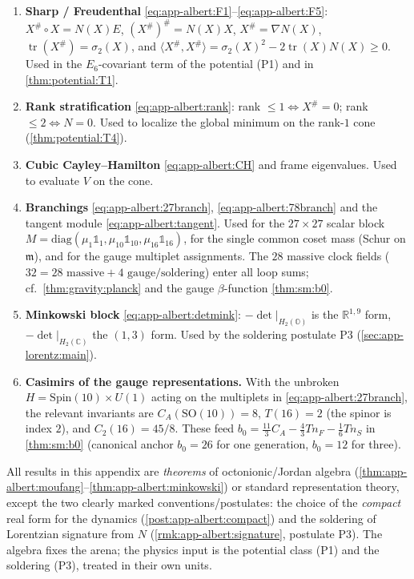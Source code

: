 \begin{enumerate}
  \item \textbf{Sharp / Freudenthal} \eqref{eq:app-albert:F1}--\eqref{eq:app-albert:F5}:
    $X^\#\circ X=N(X)E$, $(X^\#)^\#=N(X)X$, $X^\#=\nabla N(X)$,
    $\operatorname{tr}(X^\#)=\sigma_2(X)$, and
    $\langle X^\#,X^\#\rangle=\sigma_2(X)^2-2\operatorname{tr}(X)N(X)\ge0$. Used in
    the $E_6$-covariant term of the potential (P1) and in
    \autoref{thm:potential:T1}.
  \item \textbf{Rank stratification} \eqref{eq:app-albert:rank}: rank $\le1
    \Leftrightarrow X^\#=0$; rank $\le2\Leftrightarrow N=0$. Used to localize the
    global minimum on the rank-$1$ cone (\autoref{thm:potential:T4}).
  \item \textbf{Cubic Cayley--Hamilton} \eqref{eq:app-albert:CH} and frame
    eigenvalues. Used to evaluate $V$ on the cone.
  \item \textbf{Branchings} \eqref{eq:app-albert:27branch},
    \eqref{eq:app-albert:78branch} and the tangent module
    \eqref{eq:app-albert:tangent}. Used for the $27\times27$ scalar block
    $M=\mathrm{diag}(\mu_1\mathbb 1_1,\mu_{10}\mathbb 1_{10},\mu_{16}\mathbb 1_{16})$,
    for the single common coset mass (Schur on $\mathfrak m$), and for the gauge
    multiplet assignments. The $28$ massive clock fields
    ($32=28\text{ massive}+4\text{ gauge/soldering}$) enter all loop sums; cf.\
    \autoref{thm:gravity:planck} and the gauge $\beta$-function
    \autoref{thm:sm:b0}.
  \item \textbf{Minkowski block} \eqref{eq:app-albert:detmink}: $-\det|_{H_2
    (\mathbb O)}$ is the $\mathbb R^{1,9}$ form, $-\det|_{H_2(\mathbb C)}$ the
    $(1,3)$ form. Used by the soldering postulate P3
    (\autoref{sec:app-lorentz:main}).
  \item \textbf{Casimirs of the gauge representations.} With the unbroken
    $H=\mathrm{Spin}(10)\times U(1)$ acting on the multiplets in
    \eqref{eq:app-albert:27branch}, the relevant invariants are
    $C_A(\mathrm{SO}(10))=8$, $T(16)=2$ (the spinor is index $2$), and
    $C_2(16)=45/8$. These feed
    $b_0=\tfrac{11}{3}C_A-\tfrac43 T n_F-\tfrac16 T n_S$ in
    \autoref{thm:sm:b0} (canonical anchor $b_0=26$ for one generation,
    $b_0=12$ for three).
\end{enumerate}

\begin{remark}[Status]\label{rmk:app-albert:status}
All results in this appendix are \emph{theorems} of octonionic/Jordan algebra
(\autoref{thm:app-albert:moufang}--\autoref{thm:app-albert:minkowski}) or standard
representation theory, except the two clearly marked conventions/postulates: the
choice of the \emph{compact} real form for the dynamics
(\autoref{post:app-albert:compact}) and the soldering of Lorentzian signature from
$N$ (\autoref{rmk:app-albert:signature}, postulate P3). The algebra fixes the
arena; the physics input is the potential class (P1) and the soldering (P3),
treated in their own units.
\end{remark}
